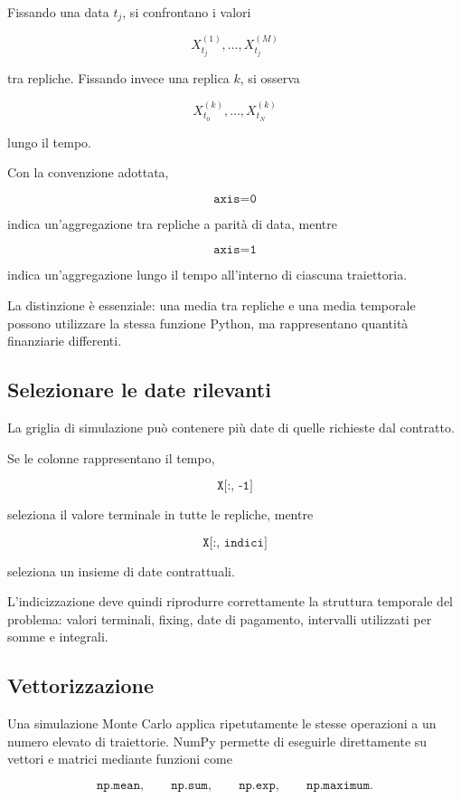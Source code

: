 Fissando una data \(t_j\), si confrontano i valori

\[
X_{t_j}^{(1)},\ldots,X_{t_j}^{(M)}
\]

\noindent tra repliche. Fissando invece una replica \(k\), si osserva

\[
X_{t_0}^{(k)},\ldots,X_{t_N}^{(k)}
\]

\noindent lungo il tempo.

Con la convenzione adottata,

\[
\texttt{axis=0}
\]

\noindent indica un'aggregazione tra repliche a parit\`a di data, mentre

\[
\texttt{axis=1}
\]

\noindent indica un'aggregazione lungo il tempo all'interno di ciascuna traiettoria.

La distinzione \`e essenziale: una media tra repliche e una media temporale
possono utilizzare la stessa funzione Python, ma rappresentano quantit\`a
finanziarie differenti.

\subsection{Selezionare le date rilevanti}

La griglia di simulazione pu\`o contenere pi\`u date di quelle richieste dal
contratto.

Se le colonne rappresentano il tempo,

\[
\texttt{X[:, -1]}
\]

\noindent seleziona il valore terminale in tutte le repliche, mentre

\[
\texttt{X[:, indici]}
\]

\noindent seleziona un insieme di date contrattuali.

L'indicizzazione deve quindi riprodurre correttamente la struttura temporale
del problema: valori terminali, fixing, date di pagamento, intervalli
utilizzati per somme e integrali.

\subsection{Vettorizzazione}

Una simulazione Monte Carlo applica ripetutamente le stesse operazioni a un
numero elevato di traiettorie. NumPy permette di eseguirle direttamente su
vettori e matrici mediante funzioni come

\[
\texttt{np.mean},
\qquad
\texttt{np.sum},
\qquad
\texttt{np.exp},
\qquad
\texttt{np.maximum}.
\]


